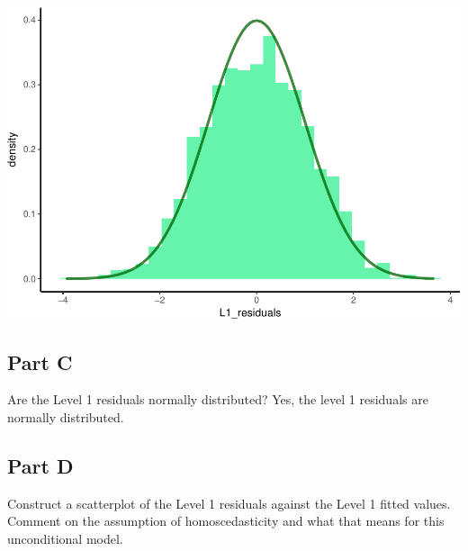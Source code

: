 \documentclass[]{article}
\newenvironment{Shaded}{\begin{snugshade}}{\end{snugshade}}
\newcommand{\KeywordTok}[1]{\textcolor[rgb]{0.13,0.29,0.53}{\textbf{#1}}}
\newcommand{\DataTypeTok}[1]{\textcolor[rgb]{0.13,0.29,0.53}{#1}}
\newcommand{\StringTok}[1]{\textcolor[rgb]{0.31,0.60,0.02}{#1}}
\newcommand{\OperatorTok}[1]{\textcolor[rgb]{0.81,0.36,0.00}{\textbf{#1}}}
\newcommand{\NormalTok}[1]{#1}
\begin{document}
\includegraphics{Beck_HW_5_R_1_files/figure-latex/unnamed-chunk-4-1.pdf}

\subsection{Part C}\label{part-c}

Are the Level 1 residuals normally distributed? Yes, the level 1
residuals are normally distributed.

\subsection{Part D}\label{part-d}

Construct a scatterplot of the Level 1 residuals against the Level 1
fitted values. Comment on the assumption of homoscedasticity and what
that means for this unconditional model.

\begin{Shaded}
\end{Shaded}
\end{document}
